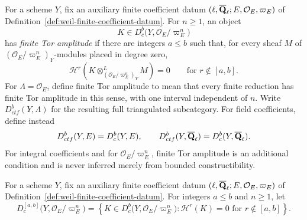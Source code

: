 \begin{definition}
\label{def:finite-tor-amplitude}


For a scheme \(Y\), fix an auxiliary finite coefficient datum
\((\ell,\overline{\mathbf Q}_\ell;E,\mathcal O_E,\varpi_E)\) of
Definition~\ref{def:weil-finite-coefficient-datum}.
For \(n\geq1\), an object
\[
 K\in D^b_c\bigl(Y,\mathcal O_E/\varpi_E^n\bigr)
\]
has \emph{finite Tor amplitude} if there are
integers \(a\leq b\) such that, for every sheaf \(M\) of
\((\mathcal O_E/\varpi_E^n)_Y\)-modules placed in degree zero,
\[
 \mathcal H^r\!\left(
 K\otimes^L_{(\mathcal O_E/\varpi_E^n)_Y}M\right)=0
 \qquad\text{for }r\notin[a,b].
\]
For \(\Lambda=\mathcal O_E\), define finite Tor amplitude to mean that every
finite reduction has finite Tor amplitude in this sense, with one interval
independent of \(n\).  Write
\(D^b_{ctf}(Y,\Lambda)\) for the resulting full triangulated subcategory.
For field coefficients, define instead
\[
 D^b_{ctf}(Y,E)=D^b_c(Y,E),
 \qquad
 D^b_{ctf}(Y,\overline{\mathbf Q}_\ell)=D^b_c(Y,\overline{\mathbf Q}_\ell).
\]
For integral coefficients and for
\(\mathcal O_E/\varpi_E^n\), finite Tor amplitude is an additional condition
and is never inferred merely from bounded constructibility.
\end{definition}


\begin{definition}
\label{def:constructible-interval}


For a scheme \(Y\), fix an auxiliary finite coefficient datum
\((\ell,\overline{\mathbf Q}_\ell;E,\mathcal O_E,\varpi_E)\) of
Definition~\ref{def:weil-finite-coefficient-datum}.
For integers \(a\leq b\) and \(n\geq1\), let
\[
 D_c^{[a,b]}\bigl(Y,\mathcal O_E/\varpi_E^n\bigr)=
 \left\{K\in D^b_c\bigl(Y,\mathcal O_E/\varpi_E^n\bigr):
 \mathcal H^r(K)=0\text{ for }r\notin[a,b]\right\}.
\]
\end{definition}


